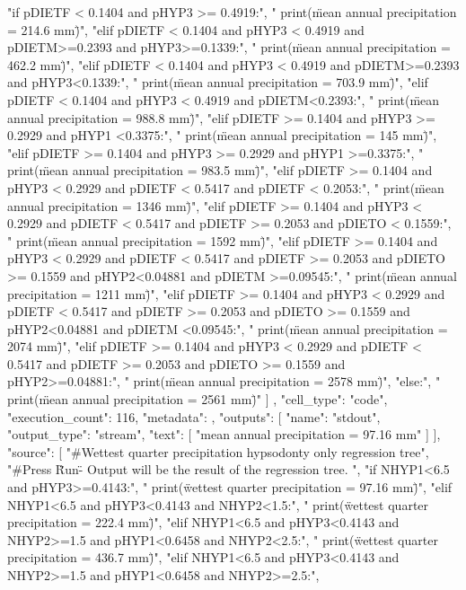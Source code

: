 {{    "if pDIETF < 0.1404 and pHYP3 >= 0.4919:\n",
    "    print(\"mean annual precipitation = 214.6 mm\")\n",
    "elif pDIETF < 0.1404 and pHYP3 < 0.4919 and pDIETM>=0.2393 and pHYP3>=0.1339:\n",
    "    print(\"mean annual precipitation = 462.2 mm\")\n",
    "elif pDIETF < 0.1404 and pHYP3 < 0.4919 and pDIETM>=0.2393 and pHYP3<0.1339:\n",
    "    print(\"mean annual precipitation = 703.9 mm\")\n",
    "elif pDIETF < 0.1404 and pHYP3 < 0.4919 and pDIETM<0.2393:\n",
    "    print(\"mean annual precipitation = 988.8 mm\")\n",
    "elif pDIETF >= 0.1404 and pHYP3 >= 0.2929 and pHYP1 <0.3375:\n",
    "    print(\"mean annual precipitation = 145 mm\")\n",
    "elif pDIETF >= 0.1404 and pHYP3 >= 0.2929 and pHYP1 >=0.3375:\n",
    "    print(\"mean annual precipitation = 983.5 mm\")\n",
    "elif pDIETF >= 0.1404 and pHYP3 < 0.2929 and pDIETF < 0.5417 and pDIETF < 0.2053:\n",
    "    print(\"mean annual precipitation = 1346 mm\")\n",
    "elif pDIETF >= 0.1404 and pHYP3 < 0.2929 and pDIETF < 0.5417 and pDIETF >= 0.2053 and pDIETO < 0.1559:\n",
    "    print(\"mean annual precipitation = 1592 mm\")\n",
    "elif pDIETF >= 0.1404 and pHYP3 < 0.2929 and pDIETF < 0.5417 and pDIETF >= 0.2053 and pDIETO >= 0.1559 and pHYP2<0.04881 and pDIETM >=0.09545:\n",
    "    print(\"mean annual precipitation = 1211 mm\")\n",
    "elif pDIETF >= 0.1404 and pHYP3 < 0.2929 and pDIETF < 0.5417 and pDIETF >= 0.2053 and pDIETO >= 0.1559 and pHYP2<0.04881 and pDIETM <0.09545:\n",
    "    print(\"mean annual precipitation = 2074 mm\")\n",
    "elif pDIETF >= 0.1404 and pHYP3 < 0.2929 and pDIETF < 0.5417 and pDIETF >= 0.2053 and pDIETO >= 0.1559 and pHYP2>=0.04881:\n",
    "    print(\"mean annual precipitation = 2578 mm\")\n",
    "else:\n",
    "    print(\"mean annual precipitation = 2561 mm\")"
   ]
  },
  {
   "cell_type": "code",
   "execution_count": 116,
   "metadata": {},
   "outputs": [
    {
     "name": "stdout",
     "output_type": "stream",
     "text": [
      "mean annual precipitation = 97.16 mm\n"
     ]
    }
   ],
   "source": [
    "#Wettest quarter precipitation hypsodonty only regression tree\n",
    "#Press \"Run\" - Output will be the result of the regression tree. \n",
    "if NHYP1<6.5 and pHYP3>=0.4143:\n",
    "    print(\"wettest quarter precipitation = 97.16 mm\")\n",
    "elif NHYP1<6.5 and pHYP3<0.4143 and NHYP2<1.5:\n",
    "    print(\"wettest quarter precipitation = 222.4 mm\")\n",
    "elif NHYP1<6.5 and pHYP3<0.4143 and NHYP2>=1.5 and pHYP1<0.6458 and NHYP2<2.5:\n",
    "    print(\"wettest quarter precipitation = 436.7 mm\")\n",
    "elif NHYP1<6.5 and pHYP3<0.4143 and NHYP2>=1.5 and pHYP1<0.6458 and NHYP2>=2.5:\n",
}}
